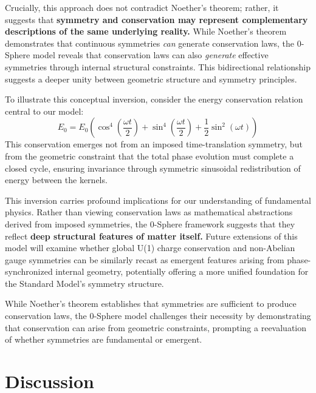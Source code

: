 \documentclass[%
 reprint,
 amsmath,amssymb,
 aps,
]{revtex4-1}
\numberwithin{equation}{section}%
\begin{document}
Crucially, this approach does not contradict Noether's theorem; rather, it suggests that \textbf{symmetry and conservation may represent complementary descriptions of the same underlying reality.} While Noether's theorem demonstrates that continuous symmetries \emph{can} generate conservation laws, the 0-Sphere model reveals that conservation laws can also \emph{generate} effective symmetries through internal structural constraints. This bidirectional relationship suggests a deeper unity between geometric structure and symmetry principles.

To illustrate this conceptual inversion, consider the energy conservation relation central to our model:
\begin{equation}
E_0 = E_0 \left( \cos^4\left(\frac{\omega t}{2}\right) + \sin^4\left(\frac{\omega t}{2}\right) + \frac{1}{2}\sin^2(\omega t) \right)
\end{equation}
This conservation emerges not from an imposed time-translation symmetry, but from the geometric constraint that the total phase evolution must complete a closed cycle, ensuring invariance through symmetric sinusoidal redistribution of energy between the kernels.


This inversion carries profound implications for our understanding of fundamental physics. Rather than viewing conservation laws as mathematical abstractions derived from imposed symmetries, the 0-Sphere framework suggests that they reflect \textbf{deep structural features of matter itself.} Future extensions of this model will examine whether global U(1) charge conservation and non-Abelian gauge symmetries can be similarly recast as emergent features arising from phase-synchronized internal geometry, potentially offering a more unified foundation for the Standard Model's symmetry structure.

While Noether’s theorem establishes that symmetries are sufficient to produce conservation laws, the 0-Sphere model challenges their necessity by demonstrating that conservation can arise from geometric constraints, prompting a reevaluation of whether symmetries are fundamental or emergent.


\section{Discussion}

\end{document}

